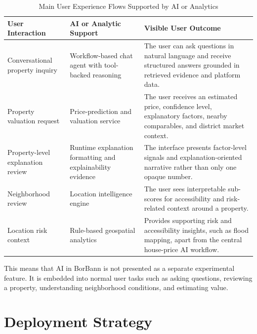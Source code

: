 \begin{table}[htbp]
    \centering
    \small
    \renewcommand{\arraystretch}{1.25}
    \begin{tabularx}{\textwidth}{>{\raggedright\arraybackslash}p{}>{\raggedright\arraybackslash}p{}>{\raggedright\arraybackslash}X}
        \toprule
        \rowcolor[gray]{0.9} \textbf{User Interaction} & \textbf{AI or Analytic Support} & \textbf{Visible User Outcome} \\
        \midrule
        Conversational property inquiry & Workflow-based chat agent with tool-backed reasoning & The user can ask questions in natural language and receive structured answers grounded in retrieved evidence and platform data. \\
        Property valuation request & Price-prediction and valuation service & The user receives an estimated price, confidence level, explanatory factors, nearby comparables, and district market context. \\
        Property-level explanation review & Runtime explanation formatting and explainability evidence & The interface presents factor-level signals and explanation-oriented narrative rather than only one opaque number. \\
        Neighborhood review & Location intelligence engine & The user sees interpretable sub-scores for accessibility and risk-related context around a property. \\
        Location risk context & Rule-based geospatial analytics & Provides supporting risk and accessibility insights, such as flood mapping, apart from the central house-price AI workflow. \\
        \bottomrule
    \end{tabularx}
    \caption{Main User Experience Flows Supported by AI or Analytics}
    \label{tab:chapter5-ux-ai}
\end{table}

This means that AI in BorBann is not presented as a separate experimental feature. It is embedded into normal user tasks such as asking questions, reviewing a property, understanding neighborhood conditions, and estimating value.

\section{Deployment Strategy}

